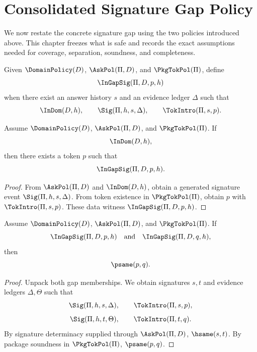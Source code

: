 \chapter{Consolidated Signature Gap Policy}
\label{ch:v151-gap-policy}

We now restate the concrete signature gap using the two policies introduced above. This chapter freezes what is safe and records the exact assumptions needed for coverage, separation, soundness, and completeness.

\begin{definition}
Given \(\DomainPolicy(D)\), \(\AskPol(\Pi,D)\), and \(\PkgTokPol(\Pi)\), define
\[
  \InGapSig(\Pi,D,p,h)
\]
when there exist an answer history \(s\) and an evidence ledger \(\Delta\) such that
\[
  \InDom(D,h),
  \qquad
  \Sig(\Pi,h,s,\Delta),
  \qquad
  \TokIntro(\Pi,s,p).
\]
\end{definition}

\begin{theorem}
\label{thm:v151-gap-coverage}
Assume \(\DomainPolicy(D)\), \(\AskPol(\Pi,D)\), and \(\PkgTokPol(\Pi)\). If
\[
  \InDom(D,h),
\]
then there exists a token \(p\) such that
\[
  \InGapSig(\Pi,D,p,h).
\]
\end{theorem}

\begin{proof}
From \(\AskPol(\Pi,D)\) and \(\InDom(D,h)\), obtain a generated signature event \(\Sig(\Pi,h,s,\Delta)\). From token existence in \(\PkgTokPol(\Pi)\), obtain \(p\) with \(\TokIntro(\Pi,s,p)\). These data witness \(\InGapSig(\Pi,D,p,h)\).
\end{proof}

\begin{theorem}
\label{thm:v151-gap-separation}
Assume \(\DomainPolicy(D)\), \(\AskPol(\Pi,D)\), and \(\PkgTokPol(\Pi)\). If
\[
  \InGapSig(\Pi,D,p,h)
  \quad\text{and}\quad
  \InGapSig(\Pi,D,q,h),
\]
then
\[
  \psame(p,q).
\]
\end{theorem}

\begin{proof}
Unpack both gap memberships. We obtain signatures \(s,t\) and evidence ledgers \(\Delta,\Theta\) such that
\[
  \Sig(\Pi,h,s,\Delta),\qquad \TokIntro(\Pi,s,p),
\]
\[
  \Sig(\Pi,h,t,\Theta),\qquad \TokIntro(\Pi,t,q).
\]
By signature determinacy supplied through \(\AskPol(\Pi,D)\), \(\hsame(s,t)\). By package soundness in \(\PkgTokPol(\Pi)\), \(\psame(p,q)\).
\end{proof}

